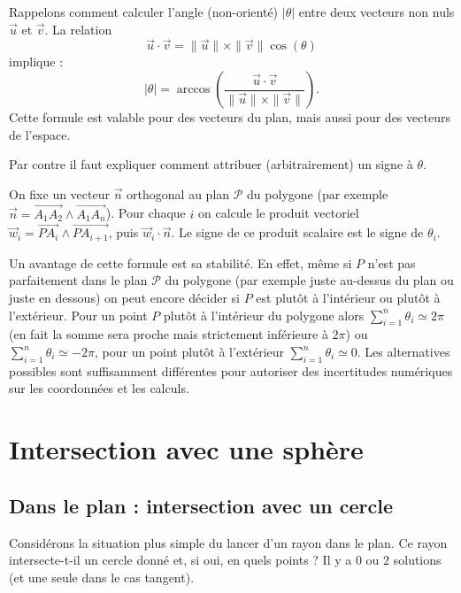 \documentclass[11pt,class=report,crop=false]{standalone}
\begin{document}
Rappelons comment calculer l'angle (non-orienté) $|\theta|$ entre deux vecteurs non nuls $\vec u$ et $\vec v$.
La relation 
$$\vec u \cdot \vec v = \|\vec u\| \times \|\vec v\| \cos(\theta)$$
implique :
$$|\theta| = \arccos\left(\frac{\vec u \cdot \vec v}{\|\vec u\| \times  \|\vec v\|}\right).$$
Cette formule est valable pour des vecteurs du plan, mais aussi pour des vecteurs de l'espace.



Par contre il faut expliquer comment attribuer (arbitrairement) un signe à $\theta$.

On fixe un vecteur $\vec n$ orthogonal au plan $\mathcal{P}$ du polygone (par exemple 
$\vec n = \overrightarrow{A_1A_2} \wedge \overrightarrow{A_1A_n}$).
Pour chaque $i$ on calcule le produit vectoriel $\vec w_i = \overrightarrow{PA_i} \wedge \overrightarrow{PA_{i+1}}$, puis $\vec w_i \cdot \vec n$. Le signe de ce produit scalaire est le signe de $\theta_i$.

\medskip

Un avantage de cette formule est sa stabilité. En effet, même si $P$ n'est pas parfaitement dans le plan $\mathcal{P}$ du polygone (par exemple juste au-dessus du plan ou juste en dessous) on peut encore décider si $P$ est plutôt à l'intérieur ou plutôt à l'extérieur.
Pour un point $P$ plutôt à l'intérieur du polygone alors $\sum_{i=1}^n \theta_i \simeq 2\pi$ (en fait la somme sera proche mais strictement inférieure à $2\pi$) ou $\sum_{i=1}^n \theta_i \simeq -2\pi$, pour un point plutôt à l'extérieur $\sum_{i=1}^n \theta_i \simeq 0$.
Les alternatives possibles sont suffisamment différentes pour autoriser des incertitudes numériques sur les coordonnées et les calculs.


\section{Intersection avec une sphère}

\subsection{Dans le plan : intersection avec un cercle}

Considérons la situation plus simple du lancer d'un rayon dans le plan. Ce rayon intersecte-t-il un cercle donné et, si oui, en quels points ?
Il y a $0$ ou $2$ solutions (et une seule dans le cas tangent).
\end{document}
